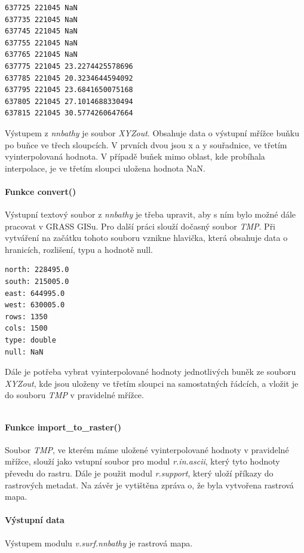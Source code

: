 \documentclass[12pt,a4paper]{article}
\begin{document}
\begin{lstlisting}
637725 221045 NaN
637735 221045 NaN
637745 221045 NaN
637755 221045 NaN
637765 221045 NaN
637775 221045 23.2274425578696
637785 221045 20.3234644594092
637795 221045 23.6841650075168
637805 221045 27.1014688330494
637815 221045 30.5774260647664
\end{lstlisting}

Výstupem z \textit{nnbathy} je soubor \textit{XYZout}. Obsahuje data o výstupní mřížce buňku po buňce ve třech sloupcích. V prvních dvou jsou x a y souřadnice, ve třetím vyinterpolovaná hodnota. V případě buňek mimo oblast, kde probíhala interpolace, je ve třetím sloupci uložena hodnota NaN.



\paragraph{Funkce convert()}
Výstupní textový soubor z \textit{nnbathy} je třeba upravit, aby s ním bylo možné dále pracovat v GRASS GISu. Pro další práci slouží dočasný soubor \textit{TMP}. Při vytváření na začátku tohoto souboru vznikne hlavička, která obsahuje data o hranicích, rozlišení, typu a hodnotě null.

\begin{lstlisting}
north: 228495.0
south: 215005.0
east: 644995.0
west: 630005.0
rows: 1350
cols: 1500
type: double
null: NaN
\end{lstlisting}

Dále je potřeba vybrat vyinterpolované hodnoty jednotlivých buněk ze souboru \textit{XYZout}, kde jsou uloženy ve třetím sloupci na samostatných řádcích, a vložit je do souboru \textit{TMP} v pravidelné mřížce.

\begin{lstlisting}
\end{lstlisting}

\paragraph{Funkce import\_to\_raster()}
Soubor \textit{TMP}, ve kterém máme uložené vyinterpolované hodnoty v pravidelné mřížce, slouží jako vstupní soubor pro modul \textit{r.in.ascii}, který tyto hodnoty převedu do rastru. Dále je použit modul \textit{r.support}, který uloží příkazy do rastrových metadat. Na závěr je vytištěna zpráva o, že byla vytvořena rastrová mapa.


\paragraph{Výstupní data}
Výstupem modulu \textit{v.surf.nnbathy} je rastrová mapa.
\end{document}
